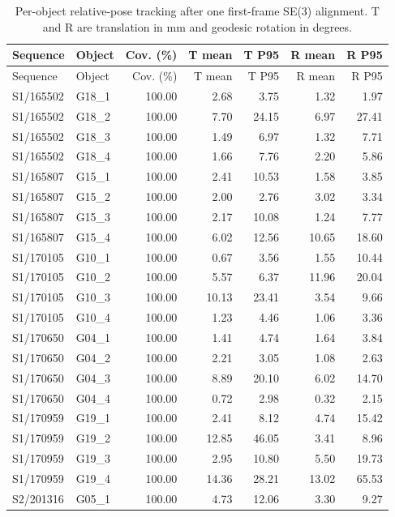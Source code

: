 \begin{longtable}{llrrrrr}
\caption{Per-object relative-pose tracking after one first-frame SE(3) alignment. T and R are translation in mm and geodesic rotation in degrees.}\label{tab:hocap-object-detail}\\
\toprule Sequence & Object & Cov. (\%) & T mean & T P95 & R mean & R P95 \\
\midrule\endfirsthead
\toprule Sequence & Object & Cov. (\%) & T mean & T P95 & R mean & R P95 \\
\midrule\endhead
S1/165502 & G18\_1 & 100.00 & 2.68 & 3.75 & 1.32 & 1.97 \\
S1/165502 & G18\_2 & 100.00 & 7.70 & 24.15 & 6.97 & 27.41 \\
S1/165502 & G18\_3 & 100.00 & 1.49 & 6.97 & 1.32 & 7.71 \\
S1/165502 & G18\_4 & 100.00 & 1.66 & 7.76 & 2.20 & 5.86 \\
S1/165807 & G15\_1 & 100.00 & 2.41 & 10.53 & 1.58 & 3.85 \\
S1/165807 & G15\_2 & 100.00 & 2.00 & 2.76 & 3.02 & 3.34 \\
S1/165807 & G15\_3 & 100.00 & 2.17 & 10.08 & 1.24 & 7.77 \\
S1/165807 & G15\_4 & 100.00 & 6.02 & 12.56 & 10.65 & 18.60 \\
S1/170105 & G10\_1 & 100.00 & 0.67 & 3.56 & 1.55 & 10.44 \\
S1/170105 & G10\_2 & 100.00 & 5.57 & 6.37 & 11.96 & 20.04 \\
S1/170105 & G10\_3 & 100.00 & 10.13 & 23.41 & 3.54 & 9.66 \\
S1/170105 & G10\_4 & 100.00 & 1.23 & 4.46 & 1.06 & 3.36 \\
S1/170650 & G04\_1 & 100.00 & 1.41 & 4.74 & 1.64 & 3.84 \\
S1/170650 & G04\_2 & 100.00 & 2.21 & 3.05 & 1.08 & 2.63 \\
S1/170650 & G04\_3 & 100.00 & 8.89 & 20.10 & 6.02 & 14.70 \\
S1/170650 & G04\_4 & 100.00 & 0.72 & 2.98 & 0.32 & 2.15 \\
S1/170959 & G19\_1 & 100.00 & 2.41 & 8.12 & 4.74 & 15.42 \\
S1/170959 & G19\_2 & 100.00 & 12.85 & 46.05 & 3.41 & 8.96 \\
S1/170959 & G19\_3 & 100.00 & 2.95 & 10.80 & 5.50 & 19.73 \\
S1/170959 & G19\_4 & 100.00 & 14.36 & 28.21 & 13.02 & 65.53 \\
S2/201316 & G05\_1 & 100.00 & 4.73 & 12.06 & 3.30 & 9.27 \\

\end{longtable}

